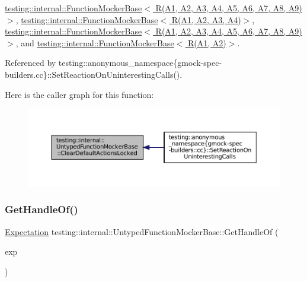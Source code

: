 \hyperlink{classtesting_1_1internal_1_1FunctionMockerBase_ada818fcb2b892f21bb939def386599e7}{testing\+::internal\+::\+Function\+Mocker\+Base$<$ R(\+A1, A2, A3, A4, A5, A6, A7, A8, A9)$>$}, \hyperlink{classtesting_1_1internal_1_1FunctionMockerBase_ada818fcb2b892f21bb939def386599e7}{testing\+::internal\+::\+Function\+Mocker\+Base$<$ R(\+A1, A2, A3, A4)$>$}, \hyperlink{classtesting_1_1internal_1_1FunctionMockerBase_ada818fcb2b892f21bb939def386599e7}{testing\+::internal\+::\+Function\+Mocker\+Base$<$ R(\+A1, A2, A3, A4, A5, A6, A7, A8, A9) $>$}, and \hyperlink{classtesting_1_1internal_1_1FunctionMockerBase_ada818fcb2b892f21bb939def386599e7}{testing\+::internal\+::\+Function\+Mocker\+Base$<$ R(\+A1, A2)$>$}.



Referenced by testing\+::anonymous\+\_\+namespace\{gmock-\/spec-\/builders.\+cc\}\+::\+Set\+Reaction\+On\+Uninteresting\+Calls().

Here is the caller graph for this function\+:
\nopagebreak
\begin{figure}[H]
\begin{center}
\leavevmode
\includegraphics[width=350pt]{classtesting_1_1internal_1_1UntypedFunctionMockerBase_a40ddd95736946a7951033aa89a7b617f_icgraph}
\end{center}
\end{figure}
\mbox{\label{classtesting_1_1internal_1_1UntypedFunctionMockerBase_a7705611c4a63df16cddb0674878c403a}} 
\subsubsection{\texorpdfstring{Get\+Handle\+Of()}{GetHandleOf()}}
{\footnotesize\ttfamily \hyperlink{classtesting_1_1Expectation}{Expectation} testing\+::internal\+::\+Untyped\+Function\+Mocker\+Base\+::\+Get\+Handle\+Of (\begin{DoxyParamCaption}\item[{\hyperlink{classtesting_1_1internal_1_1ExpectationBase}{Expectation\+Base} $\ast$}]{exp }\end{DoxyParamCaption})\hspace{0.3cm}{\ttfamily [protected]}}



